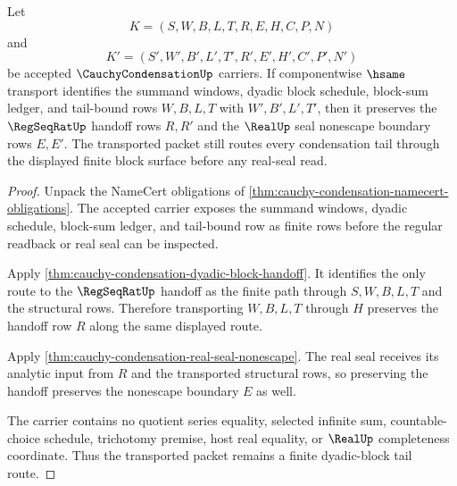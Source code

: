 \begin{theorem}
\label{thm:cauchy-condensation-dyadic-block-tail-transport}
Let
$$
K=(S,W,B,L,T,R,E,H,C,P,N)
$$
and
$$
K'=(S',W',B',L',T',R',E',H',C',P',N')
$$
be accepted $\CauchyCondensationUp$ carriers. If componentwise $\hsame$ transport identifies the summand windows, dyadic block schedule, block-sum ledger, and tail-bound rows $W,B,L,T$ with $W',B',L',T'$, then it preserves the $\RegSeqRatUp$ handoff rows $R,R'$ and the $\RealUp$ seal nonescape boundary rows $E,E'$. The transported packet still routes every condensation tail through the displayed finite block surface before any real-seal read.
\end{theorem}
\begin{proof}
Unpack the NameCert obligations of \autoref{thm:cauchy-condensation-namecert-obligations}. The accepted carrier exposes the summand windows, dyadic schedule, block-sum ledger, and tail-bound row as finite rows before the regular readback or real seal can be inspected.

Apply \autoref{thm:cauchy-condensation-dyadic-block-handoff}. It identifies the only route to the $\RegSeqRatUp$ handoff as the finite path through $S,W,B,L,T$ and the structural rows. Therefore transporting $W,B,L,T$ through $H$ preserves the handoff row $R$ along the same displayed route.

Apply \autoref{thm:cauchy-condensation-real-seal-nonescape}. The real seal receives its analytic input from $R$ and the transported structural rows, so preserving the handoff preserves the nonescape boundary $E$ as well.

The carrier contains no quotient series equality, selected infinite sum, countable-choice schedule, trichotomy premise, host real equality, or $\RealUp$ completeness coordinate. Thus the transported packet remains a finite dyadic-block tail route.
\end{proof}

